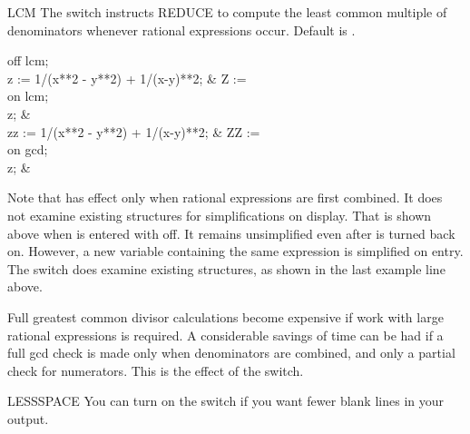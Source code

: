 \begin{Switch}{LCM}
The  switch instructs REDUCE to compute the least common multiple
of denominators whenever rational expressions occur.  Default is .

\begin{Examples}
off lcm; \\
z := 1/(x**2 - y**2) + 1/(x-y)**2;  
			     &     Z :=  \\
on lcm; \\
z;                           &      \\
zz := 1/(x**2 - y**2) + 1/(x-y)**2;
			     &     ZZ :=  \\
on gcd; \\
z;                           &     
\end{Examples}

\begin{Comments}
Note that  has effect only when rational expressions are first
combined.  It does not examine existing structures for simplifications on
display.  That is shown above when  is entered with
 off.  It remains unsimplified even after  is turned
back on.  However, a new variable containing the same expression is
simplified on entry.  The switch  does examine existing
structures, as shown in the last example line above.

Full greatest common divisor calculations become expensive if work with
large rational expressions is required.  A considerable savings of time
can be had if a full gcd check is made only when denominators are combined,
and only a partial check for numerators.  This is the effect of the 
switch.
\end{Comments}
\end{Switch}


\begin{Switch}[lessspace]{LESSSPACE}
You can turn on the switch  if you want fewer
blank lines in your output.
\end{Switch}



